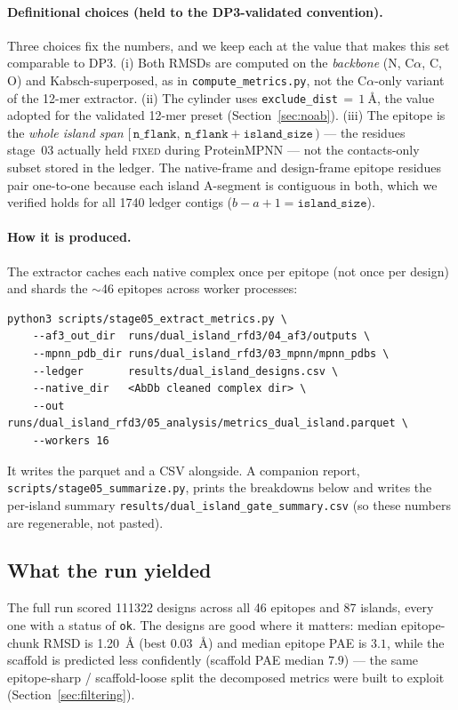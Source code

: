\paragraph{Definitional choices (held to the DP3-validated convention).}
Three choices fix the numbers, and we keep each at the value that makes this set comparable to
DP3. (i) Both RMSDs are computed on the \emph{backbone} (N, C$\alpha$, C, O) and
Kabsch-superposed, as in \texttt{compute\_metrics.py}, not the C$\alpha$-only variant of the
12-mer extractor. (ii) The cylinder uses \texttt{exclude\_dist}\,$=\,\SI{1}{\angstrom}$, the
value adopted for the validated 12-mer preset (Section~\ref{sec:noab}). (iii) The epitope is
the \emph{whole island span} $[\,\texttt{n\_flank},\ \texttt{n\_flank}+\texttt{island\_size}\,)$
--- the residues stage~03 actually held \textsc{fixed} during ProteinMPNN --- not the
contacts-only subset stored in the ledger. The native-frame and design-frame epitope residues
pair one-to-one because each island A-segment is contiguous in both, which we verified holds
for all \num{1740} ledger contigs ($b-a+1=\texttt{island\_size}$).

\paragraph{How it is produced.}
The extractor caches each native complex once per epitope (not once per design) and shards the
$\sim$46 epitopes across worker processes:
\begin{verbatim}
python3 scripts/stage05_extract_metrics.py \
    --af3_out_dir  runs/dual_island_rfd3/04_af3/outputs \
    --mpnn_pdb_dir runs/dual_island_rfd3/03_mpnn/mpnn_pdbs \
    --ledger       results/dual_island_designs.csv \
    --native_dir   <AbDb cleaned complex dir> \
    --out          runs/dual_island_rfd3/05_analysis/metrics_dual_island.parquet \
    --workers 16
\end{verbatim}
It writes the parquet and a CSV alongside. A companion report,
\texttt{scripts/stage05\_summarize.py}, prints the breakdowns below and writes the per-island
summary \texttt{results/dual\_island\_gate\_summary.csv} (so these numbers are regenerable,
not pasted).

\subsection{What the run yielded}\label{sec:metricsresults}
The full run scored \num{111322} designs across all 46 epitopes and 87 islands, every one with
a status of \texttt{ok}. The designs are good where it matters: median epitope-chunk RMSD is
\SI{1.20}{\angstrom} (best \SI{0.03}{\angstrom}) and median epitope PAE is $3.1$, while the
scaffold is predicted less confidently (scaffold PAE median $7.9$) --- the same
epitope-sharp / scaffold-loose split the decomposed metrics were built to exploit
(Section~\ref{sec:filtering}).

